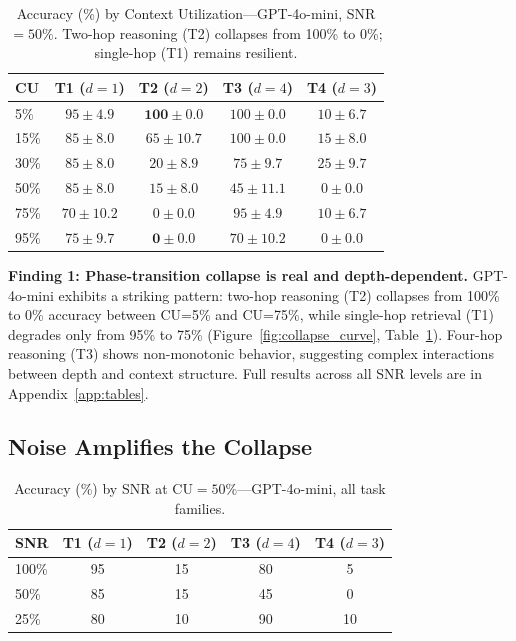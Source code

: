 \documentclass{article}
\begin{document}
\begin{table}[t]
\centering
\small
\caption{Accuracy (\%) by Context Utilization---GPT-4o-mini, SNR${=}50\%$. Two-hop reasoning (T2) collapses from 100\% to 0\%; single-hop (T1) remains resilient.}
\label{tab:mini_snr50}
\begin{tabular}{@{}lcccc@{}}
\toprule
CU & T1 ($d{=}1$) & T2 ($d{=}2$) & T3 ($d{=}4$) & T4 ($d{=}3$) \\
\midrule
5\%  & $95 \pm 4.9$ & $\mathbf{100 \pm 0.0}$ & $100 \pm 0.0$ & $10 \pm 6.7$ \\
15\% & $85 \pm 8.0$ & $65 \pm 10.7$ & $100 \pm 0.0$ & $15 \pm 8.0$ \\
30\% & $85 \pm 8.0$ & $20 \pm 8.9$ & $75 \pm 9.7$ & $25 \pm 9.7$ \\
50\% & $85 \pm 8.0$ & $15 \pm 8.0$ & $45 \pm 11.1$ & $0 \pm 0.0$ \\
75\% & $70 \pm 10.2$ & $0 \pm 0.0$ & $95 \pm 4.9$ & $10 \pm 6.7$ \\
95\% & $75 \pm 9.7$ & $\mathbf{0 \pm 0.0}$ & $70 \pm 10.2$ & $0 \pm 0.0$ \\
\bottomrule
\end{tabular}
\end{table}

\textbf{Finding 1: Phase-transition collapse is real and depth-dependent.} GPT-4o-mini exhibits a striking pattern: two-hop reasoning (T2) collapses from 100\% to 0\% accuracy between CU=5\% and CU=75\%, while single-hop retrieval (T1) degrades only from 95\% to 75\% (Figure~\ref{fig:collapse_curve}, Table~\ref{tab:mini_snr50}). Four-hop reasoning (T3) shows non-monotonic behavior, suggesting complex interactions between depth and context structure. Full results across all SNR levels are in Appendix~\ref{app:tables}.

\subsection{Noise Amplifies the Collapse}

\begin{table}[t]
\centering
\small
\caption{Accuracy (\%) by SNR at CU${=}50\%$---GPT-4o-mini, all task families.}
\label{tab:snr_variation}
\begin{tabular}{@{}lcccc@{}}
\toprule
SNR & T1 ($d{=}1$) & T2 ($d{=}2$) & T3 ($d{=}4$) & T4 ($d{=}3$) \\
\midrule
100\% & 95 & 15 & 80 & 5 \\
50\%  & 85 & 15 & 45 & 0 \\
25\%  & 80 & 10 & 90 & 10 \\
\bottomrule
\end{tabular}
\end{table}
\end{document}
